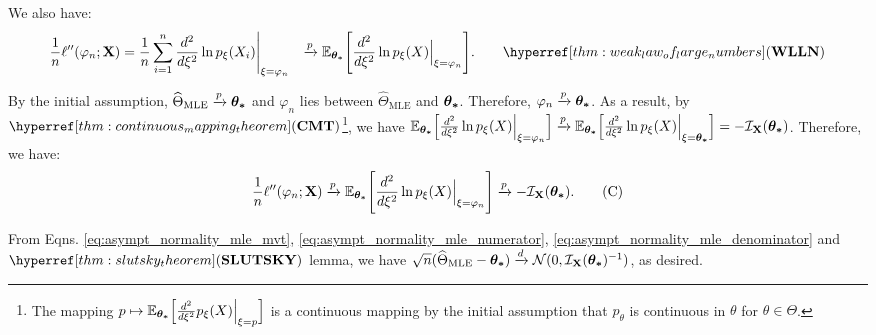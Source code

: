 \begin{proof*}
    \noindent We also have:
    \begin{align*}
        \frac{1}{n}\ell''(\varphi_n;\bX) &= \frac{1}{n} \sum_{i=1}^n \frac{d^2}{d\xi^2}\ln p_\xi(X_i)\Bigg|_{\xi=\varphi_n} 
        &\xrightarrow{p} \E_{\btheta}\biggSquare{\frac{d^2}{d\xi^2}\ln p_\xi(X)\Big|_{\xi=\varphi_n}}. \qquad \WLLN
    \end{align*} 

    \noindent By the initial assumption, $\widehat{\Theta}_\mathrm{MLE}\xrightarrow{p}\boldsymbol{\theta_*}$ and $\varphi_n$ lies between $\widehat{\Theta}_\mathrm{MLE}$ and $\boldsymbol{\theta_*}$. Therefore, $\varphi_n\xrightarrow{p}\boldsymbol{\theta_*}$. As a result, by $\CMT$\footnote{The mapping $p\mapsto \mathbb{E}_{\boldsymbol{\theta_*}}\Big[ \frac{d^2}{d\xi^2} p_\xi(X)\Big|_{\xi=p} \Big]$ is a continuous mapping by the initial assumption that $p_\theta$ is continuous in $\theta$ for $\theta\in\Theta$.}, we have $\mathbb{E}_{\boldsymbol{\theta_*}}\Big[ \frac{d^2}{d\xi^2}\ln p_\xi(X)\Big|_{\xi=\varphi_n} \Big]\xrightarrow{p}\mathbb{E}_{\boldsymbol{\theta_*}}\Big[ \frac{d^2}{d\xi^2}\ln p_\xi(X)\Big|_{\xi=\boldsymbol{\theta_*}} \Big] = -\mathcal{I}_{{\bf X}}(\boldsymbol{\theta_*})$. Therefore, we have:
    \begin{equation}
        \label{eq:asympt_normality_mle_denominator} 
        \frac{1}{n}\ell''(\varphi_n;{\bf X}) \xrightarrow{p} \mathbb{E}_{\boldsymbol{\theta_*}}\Bigg[ \frac{d^2}{d\xi^2}\ln p_\xi(X)\Big|_{\xi=\varphi_n} \Bigg] \xrightarrow{p} -\mathcal{I}_{{\bf X}}(\boldsymbol{\theta_*}).\tag{C}
    \end{equation} 

    \noindent From Eqns. \ref{eq:asympt_normality_mle_mvt}, \ref{eq:asympt_normality_mle_numerator}, \ref{eq:asympt_normality_mle_denominator} and $\SLUTSKY$ lemma, we have $\sqrt{n}(\widehat{\Theta}_\mathrm{MLE} - \boldsymbol{\theta_*}) \xrightarrow{d}\mathcal{N}(0, \mathcal{I}_{{\bf X}}(\boldsymbol{\theta_*})^{-1})$, as desired.
\end{proof*}